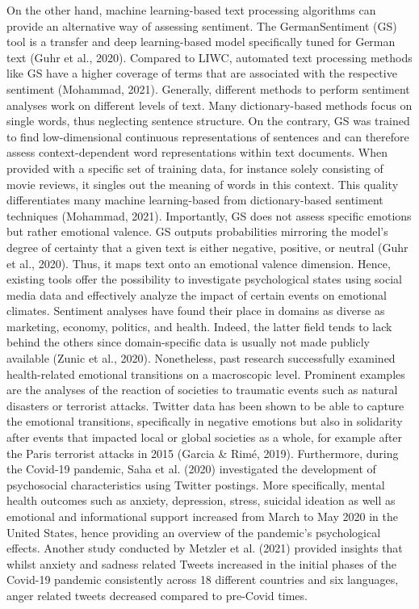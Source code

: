 \documentclass[
  english,
  jou,floatsintext]{apa7}
\begin{document}
On the other hand, machine learning-based text processing algorithms can provide an alternative way of assessing sentiment. The GermanSentiment (GS) tool is a transfer and deep learning-based model specifically tuned for German text (Guhr et al., 2020). Compared to LIWC, automated text processing methods like GS have a higher coverage of terms that are associated with the respective sentiment (Mohammad, 2021). Generally, different methods to perform sentiment analyses work on different levels of text. Many dictionary-based methods focus on single words, thus neglecting sentence structure. On the contrary, GS was trained to find low-dimensional continuous representations of sentences and can therefore assess context-dependent word representations within text documents. When provided with a specific set of training data, for instance solely consisting of movie reviews, it singles out the meaning of words in this context. This quality differentiates many machine learning-based from dictionary-based sentiment techniques (Mohammad, 2021).
Importantly, GS does not assess specific emotions but rather emotional valence. GS outputs probabilities mirroring the model's degree of certainty that a given text is either negative, positive, or neutral (Guhr et al., 2020). Thus, it maps text onto an emotional valence dimension.
Hence, existing tools offer the possibility to investigate psychological states using social media data and effectively analyze the impact of certain events on emotional climates. Sentiment analyses have found their place in domains as diverse as marketing, economy, politics, and health. Indeed, the latter field tends to lack behind the others since domain-specific data is usually not made publicly available (Zunic et al., 2020). Nonetheless, past research successfully examined health-related emotional transitions on a macroscopic level. Prominent examples are the analyses of the reaction of societies to traumatic events such as natural disasters or terrorist attacks. Twitter data has been shown to be able to capture the emotional transitions, specifically in negative emotions but also in solidarity after events that impacted local or global societies as a whole, for example after the Paris terrorist attacks in 2015 (Garcia \& Rimé, 2019). Furthermore, during the Covid-19 pandemic, Saha et al. (2020) investigated the development of psychosocial characteristics using Twitter postings. More specifically, mental health outcomes such as anxiety, depression, stress, suicidal ideation as well as emotional and informational support increased from March to May 2020 in the United States, hence providing an overview of the pandemic's psychological effects.
Another study conducted by Metzler et al. (2021) provided insights that whilst anxiety and sadness related Tweets increased in the initial phases of the Covid-19 pandemic consistently across 18 different countries and six languages, anger related tweets decreased compared to pre-Covid times.
\end{document}
